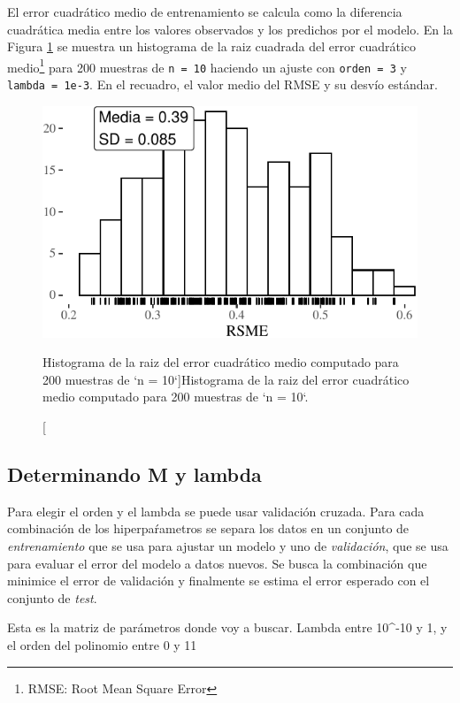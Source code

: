 \documentclass[]{tufte-handout}
\begin{document}
El error cuadrático medio de entrenamiento se calcula como la diferencia cuadrática media entre los valores observados y los predichos por el modelo. En la Figura \ref{fig:rmse-sd} se muestra un histograma de la raiz cuadrada del error cuadrático medio\footnote{RMSE: Root Mean Square Error} para 200 muestras de \texttt{n\ =\ 10} haciendo un ajuste con \texttt{orden\ =\ 3} y \texttt{lambda\ =\ 1e-3}. En el recuadro, el valor medio del RMSE y su desvío estándar.

\begin{figure}
\includegraphics{TP-Labo-1_files/figure-latex/rmse-sd-1} \caption[Histograma de la raiz del error cuadrático medio computado para 200 muestras de `n = 10`]{Histograma de la raiz del error cuadrático medio computado para 200 muestras de `n = 10`.}\label{fig:rmse-sd}
\end{figure}

\hypertarget{determinando-m-y-lambda}{%
\subsection{Determinando M y lambda}\label{determinando-m-y-lambda}}

Para elegir el orden y el lambda se puede usar validación cruzada. Para cada combinación de los hiperpaŕametros se separa los datos en un conjunto de \emph{entrenamiento} que se usa para ajustar un modelo y uno de \emph{validación}, que se usa para evaluar el error del modelo a datos nuevos. Se busca la combinación que minimice el error de validación y finalmente se estima el error esperado con el conjunto de \emph{test}.

Esta es la matriz de parámetros donde voy a buscar. Lambda entre 10\^{}-10 y 1, y el orden del polinomio entre 0 y 11
\end{document}

